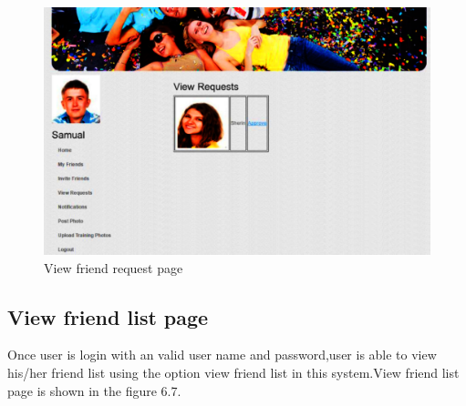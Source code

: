 \begin{figure}[H]
\begin{minipage}[c]{1\linewidth}
\begin{center}
\includegraphics[width=\textwidth]{pendingrequest.png}
            \caption[View Friend Request Page]{View friend request page}
             \label{View friend request}
\end{center}
\end{minipage}
            
\end{figure}

\clearpage
 \subsection[View Friend List Page]{View friend list page}
 \noindent
 Once user is login with an valid user name and password,user is able to view his/her friend list using the option view friend list in this system.View friend list page is shown in the figure 6.7. 
 \vspace{1cm} 
\vspace{1cm}
\vspace{1cm} 
 
